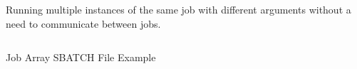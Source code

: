 \begin{usecases}
        Running multiple instances of the same job with different arguments without a need to communicate between jobs.
\end{usecases}
\begin{example}
    \begin{listing}[!ht]
        \inputminted{bash}{source_code/job_arrays/array-example.sh}
        \caption{Job Array SBATCH File Example}
    \end{listing}
\end{example}